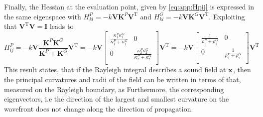 Finally, the Hessian at the evaluation point, given by \eqref{eq:app:Hpij} is expressed in the same eigenspace with $H^P_{kl} = -k \mathbf{V} \mathbf{K}^P \mathbf{V}^{\mathrm{T}}$ and $H^G_{kl} = -k \mathbf{V} \mathbf{K}^G \mathbf{V}^{\mathrm{T}}$.
Exploiting that $\mathbf{V}^{\mathrm{T}}\mathbf{V} = \mathbf{I}$ leads to
\begin{equation}
H_{ij}^P = 
-k \mathbf{V} \frac{ \mathbf{K}^P \mathbf{K}^G  }{\mathbf{K}^P + \mathbf{K}^G }   \mathbf{V}^{\mathrm{T}} =
-k \mathbf{V} 
\begin{bmatrix}
\frac{\kappa_1^P \kappa_1^G}{\kappa_1^P + \kappa_1^G} & 0 \\[.5em]
0 & \frac{\kappa_2^P \kappa_2^G}{\kappa_2^P + \kappa_2^G}
\\[0.3em]    \end{bmatrix}
\mathbf{V}^{\mathrm{T}}
=
-k \mathbf{V} 
\begin{bmatrix}
\frac{1}{\rho_1^P+\rho_1^G} & 0 \\[.5em]
0 & \frac{1}{\rho_2^P+\rho_2^G}
\\[0.3em]    \end{bmatrix}
\mathbf{V}^{\mathrm{T}}
\end{equation}
This result states, that if the Rayleigh integral describes a sound field at $\mathbf{x}$, then the principal curvatures and radii of the field can be written in terms of that, measured on the Rayleigh boundary, as
Furthermore, the corresponding eigenvectors, i.e the direction of the largest and smallest curvature on the wavefront does not change along the direction of propagation.

\vspace{3mm}
